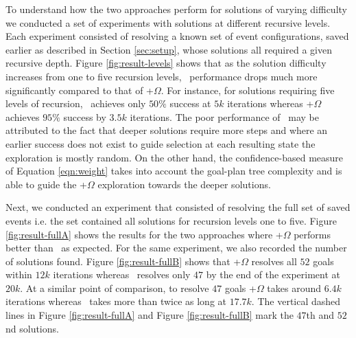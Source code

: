 \begin{figure*}[t]
\begin{center}
\subfigure[\CL]{\label{fig:result-levelsA}

}
\qquad
\subfigure[\CL+$\Omega$]{\label{fig:result-levelsB}

}
\vskip -0.2cm
\caption{Agent performance under \CL\ and \CL+$\Omega$ schemes for solutions at recursion levels one (pluses), three (circles) and five (crosses). Each point represents results from $5$ experiment runs using an averaging window of $100$ samples.}
\label{fig:result-levels}
\end{center}
\end{figure*}

To understand how the two approaches perform for solutions of varying difficulty we conducted a set of experiments with solutions at different recursive levels. Each experiment consisted of resolving a known set of  event configurations, saved earlier as described in Section \ref{sec:setup}, whose solutions all required a given recursive depth. Figure \ref{fig:result-levels} shows that as the solution difficulty increases from one to five recursion levels, \CL\ performance drops much more significantly compared to that of \CL+$\Omega$. For instance, for solutions requiring five levels of recursion, \CL\ achieves only $50\%$ success at $5k$ iterations whereas \CL+$\Omega$ achieves $95\%$ success by $3.5k$ iterations. The poor performance of \CL\ may be attributed to the fact that deeper solutions require more  steps and where an earlier success does not exist to guide selection at each resulting state the exploration is mostly random. On the other hand, the confidence-based measure of Equation \ref{eqn:weight} takes into account the goal-plan tree complexity and is able to guide the \CL+$\Omega$ exploration towards the deeper solutions.

Next, we conducted an experiment that consisted of resolving the full set of saved  events i.e. the set contained all solutions for recursion levels one to five. Figure \ref{fig:result-fullA} shows the results for the two approaches where \CL+$\Omega$ performs better than \CL\ as expected. For the same experiment, we also recorded the number of solutions found. Figure \ref{fig:result-fullB} shows that \CL+$\Omega$ resolves all $52$ goals within $12k$ iterations whereas \CL\ resolves only $47$ by the end of the experiment at $20k$. At a similar point of comparison, to resolve $47$ goals \CL+$\Omega$ takes around $6.4k$ iterations whereas \CL\ takes more than twice as long at $17.7k$. The vertical dashed lines in Figure \ref{fig:result-fullA} and Figure \ref{fig:result-fullB} mark the $47$th and $52$nd solutions.

